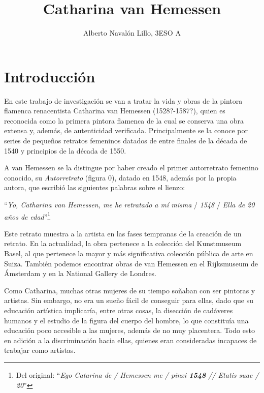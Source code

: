\documentclass[12pt]{report}
\title{\textbf{Catharina van Hemessen}}
\author{Alberto Navalón Lillo, 3ESO A}
\begin{document}
\frontmatter
\maketitle
\tableofcontents
\mainmatter


\chapter*{Introducción}

En este trabajo de investigación se van a tratar la vida y obras de la pintora flamenca renacentista Catharina van Hemessen (1528?-1587?), quien es reconocida como la primera pintora flamenca de la cual se conserva una obra extensa y, además, de autenticidad verificada. Principalmente se la conoce por series de pequeños retratos femeninos datados de entre finales de la década de 1540 y principios de la década de 1550.\bigskip


A van Hemessen se la distingue por haber creado el primer autorretrato femenino conocido, su \textit{Autorretrato} (figura 0), datado en 1548, además por la propia autora, que escribió las siguientes palabras sobre el lienzo:\bigskip

\indent``\textit{Yo, Catharina van Hemessen, me he retratado a mí misma} / \textit{1548} / \textit{Ella de 20 años de edad}''\footnote{Del original: ``\textit{Ego Catarina de / Hemessen me / pinxi \textbf{1548} // Etatis suae / 20}''}\bigskip

Este retrato muestra a la artista en las fases tempranas de la creación de un retrato. En la actualidad, la obra pertenece a la colección del Kunstmuseum Basel, al que pertenece la mayor y más significativa colección pública de arte en Suiza. También podemos encontrar obras de van Hemessen en el Rijksmuseum de Ámsterdam y en la National Gallery de Londres.\bigskip

Como Catharina, muchas otras mujeres de su tiempo soñaban con ser pintoras y artistas. Sin embargo, no era un sueño fácil de conseguir para ellas, dado que su educación artística implicaría, entre otras cosas, la disección de cadáveres humanos y el estudio de la figura del cuerpo del hombre, lo que constituía una educación poco accesible a las mujeres, además de no muy placentera. Todo esto en adición a la discriminación hacia ellas, quienes eran consideradas incapaces de trabajar como artistas.\bigskip
\end{document}
